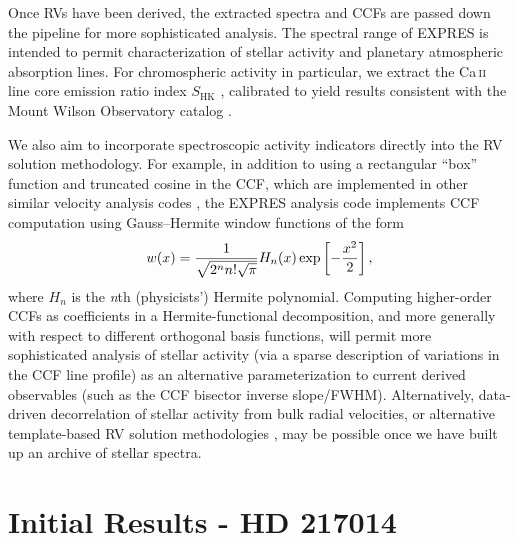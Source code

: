 Once RVs have been derived, the extracted spectra and CCFs are passed down the pipeline for more sophisticated analysis. The spectral range of EXPRES is intended to permit characterization of stellar activity and planetary atmospheric absorption lines. For chromospheric activity in particular, we extract the Ca\,\textsc{ii} line core emission ratio index $S_\mathrm{HK}$ \citep[using the parametric model of][]{isaacson_chromospheric_2010}, calibrated to yield results consistent with the Mount Wilson Observatory catalog \citep{duncan_ca_1991}.

We also aim to incorporate spectroscopic activity indicators directly into the RV solution methodology. For example, in addition to using a rectangular ``box'' function and truncated cosine in the CCF, which are implemented in other similar velocity analysis codes \citep[e.g.~][]{freudling_automated_2013, brahm_ceres_2017, modigliani_espresso_2019}, the EXPRES analysis code implements CCF computation using Gauss--Hermite window functions of the form
\begin{equation}w(x) = {1 \over \sqrt{2^n n! \sqrt{\pi}}}H_n(x) \exp\left[-{x^2 \over 2}\right],
\end{equation}
where \(H_n\) is the \textit{n}th (physicists') Hermite polynomial. Computing higher-order CCFs as coefficients in a Hermite-functional decomposition, and more generally with respect to different orthogonal basis functions, will permit more sophisticated analysis of stellar activity (via a sparse description of variations in the CCF line profile) as an alternative parameterization to current derived observables (such as the CCF bisector inverse slope/FWHM). Alternatively, data-driven decorrelation of stellar activity from bulk radial velocities, or alternative template-based RV solution methodologies \citep{holzer_hermite-gaussian_2020}, may be possible once we have built up an archive of stellar spectra.

\section{Initial Results - HD 217014}\label{initial-results}

